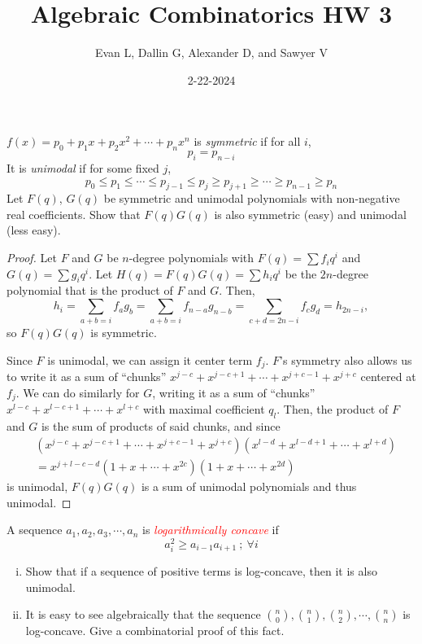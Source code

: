 \documentclass[11pt]{scrartcl}
\title{Algebraic Combinatorics HW 3}
\author{Evan L, Dallin G, Alexander D, and Sawyer V}
\date{2-22-2024}
\begin{document}
\maketitle
\setcounter{section}{1}
\begin{problem}
    $f(x)= p_0 + p_1x + p_2x^2 + \cdots + p_nx^n$ is \textit{symmetric} if for all $i$, $$p_i=p_{n-i}$$ It is \textit{unimodal} if for some fixed $j$, $$p_0\le p_1\le \cdots \le p_{j-1}\le p_j \ge p_{j+1}\ge \cdots \ge p_{n-1}\ge p_n$$ Let $F(q)$, $G(q)$ be symmetric and unimodal polynomials with non-negative real coefficients. Show that $F(q)G(q)$ is also symmetric (easy) and unimodal (less easy).
\end{problem}
\begin{proof}
Let $F$ and $G$ be $n$-degree polynomials with $F(q)=\sum f_iq^i$ and $G(q)=\sum g_iq^i$. Let $H(q)=F(q)G(q)=\sum h_i q^i$ be the $2n$-degree polynomial that is the product of $F$ and $G$. Then, \[h_i=\sum_{a+b=i}f_ag_b=\sum_{a+b=i}f_{n-a}g_{n-b}=\sum_{c+d=2n-i}f_cg_d=h_{2n-i},\] so $F(q)G(q)$ is symmetric.

Since $F$ is unimodal, we can assign it center term $f_j$. $F$'s symmetry also allows us to write it as a sum of ``chunks'' $x^{j-c}+x^{j-c+1}+\cdots+x^{j+c-1}+x^{j+c}$  centered at $f_j$. We can do similarly for $G$, writing it as a sum of ``chunks'' $x^{l-c}+x^{l-c+1}+\cdots+x^{l+c}$ with maximal coefficient $q_l$. Then, the product of $F$ and $G$ is the sum of products of said chunks, and since 
\begin{align*}
    &(x^{j-c}+x^{j-c+1}+\cdots+x^{j+c-1}+x^{j+c})(x^{l-d}+x^{l-d+1}+\cdots+x^{l+d})\\
    &=x^{j+l-c-d}(1+x+\cdots+x^{2c})(1+x+\cdots+x^{2d})
\end{align*}
is unimodal, $F(q)G(q)$ is a sum of unimodal polynomials and thus unimodal.
\end{proof}
\begin{problem}[\textcolor{red}{Log-concavity of Binomial coefficients}]
    A sequence $a_1,a_2, a_3, \cdots, a_n$ is \textcolor{red}{\textit{logarithmically concave}} if $$a_i^2\ge a_{i-1}a_{i+1}~;~ \forall i$$

    \begin{enumerate}[(i)]
        \item Show that if a sequence of positive terms is log-concave, then it is also unimodal.\smallskip
        \item It is easy to see algebraically that the sequence $\binom{n}{0},\binom{n}{1}, \binom{n}{2}, \cdots, \binom{n}{n}$ is log-concave. Give a combinatorial proof of this fact.
    \end{enumerate}
\end{problem}
\end{document}

